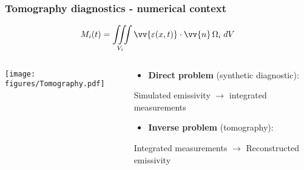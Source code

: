 \documentclass[10pt]{beamer}
\begin{document}
\begin{frame}
\frametitle{Tomography diagnostics - numerical context}
    \vspace{-0.75cm}

    $$M_i(t) = \iiint\limits_{V_i} \vv{\varepsilon(x,t)}\cdot\vv{n} \,\Omega_i \;{d}V$$
    \vspace{-0.75cm}
\begin{columns}
    	\begin{column}{0.325\textwidth}
    	
    	\texttt{[image: figures/Tomography.pdf]}

    	\end{column}

   	\begin{column}{0.675\textwidth}
   	\begin{center}
   	
   	\begin{block}{}
	\begin{itemize}
	\item \textcolor{myblue}{\textbf{Direct problem} (synthetic diagnostic):\\
	}
	\end{itemize}
	\end{block}
Simulated emissivity $\longrightarrow$ integrated measurements\\

   	\begin{block}{}
	\begin{itemize}
	\item \textcolor{myblue}{\textbf{Inverse problem} (tomography):\\
	}
	\end{itemize}
	\end{block}
Integrated measurements $\longrightarrow$ Reconstructed emissivity \\

   	\end{center}
	
   	\end{column}
%    	
\end{columns}


\end{frame}
\end{document}

